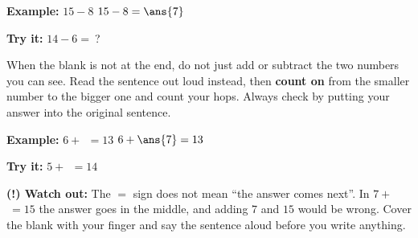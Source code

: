 \documentclass[12pt]{article}
\begin{document}
\begin{examplebox}
\textbf{Example:} $15 - 8$
$15 - 8 = \ans{7}$
\end{examplebox}

\begin{tryitbox}
\textbf{Try it:} $14 - 6 = \ $?\\[2pt]
\end{tryitbox}


\begin{formulabox}
When the blank is not at the end, do not just add or subtract the two numbers
you can see. Read the sentence out loud instead, then \textbf{count on} from the
smaller number to the bigger one and count your hops. Always check by putting
your answer into the original sentence.
\end{formulabox}

\begin{examplebox}
\textbf{Example:} $6 + \ $\underline{\hspace{0.7cm}}$ \ = 13$
$6 + \ans{7} = 13$
\end{examplebox}

\begin{tryitbox}
\textbf{Try it:} $5 + \ $\underline{\hspace{0.7cm}}$ \ = 14$\\[2pt]
\end{tryitbox}

\begin{watchoutbox}
\textbf{(!) Watch out:} The $=$ sign does not mean ``the answer comes next''.
In $7 + \ $\underline{\hspace{0.7cm}}$ \ = 15$ the answer goes in the middle, and
adding $7$ and $15$ would be wrong. Cover the blank with your finger and say the
sentence aloud before you write anything.
\end{watchoutbox}
\end{document}
